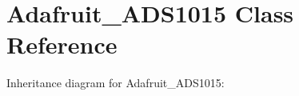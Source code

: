 \hypertarget{classAdafruit__ADS1015}{}\section{Adafruit\+\_\+\+A\+D\+S1015 Class Reference}
\label{classAdafruit__ADS1015}


Inheritance diagram for Adafruit\+\_\+\+A\+D\+S1015\+:
